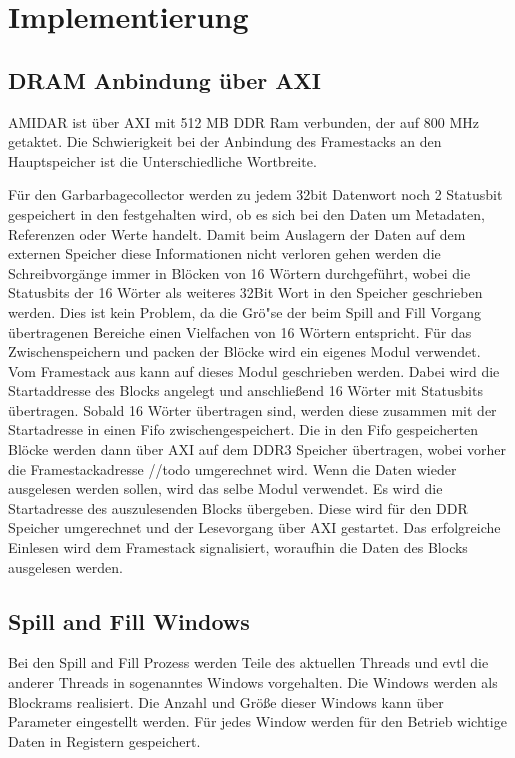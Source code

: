 \chapter{Implementierung}
\label{cha:Implementierung}
\section{DRAM Anbindung \"uber AXI}
AMIDAR ist \"uber AXI mit 512 MB DDR Ram verbunden, der auf 800 MHz getaktet.
Die Schwierigkeit bei der Anbindung des Framestacks an den Hauptspeicher ist die Unterschiedliche Wortbreite. 

F\"ur den Garbarbagecollector werden zu jedem 32bit Datenwort noch 2 Statusbit gespeichert in den festgehalten wird, ob es sich bei den Daten um Metadaten, Referenzen oder Werte handelt. Damit beim Auslagern der Daten auf dem externen Speicher diese Informationen nicht verloren gehen werden die Schreibvorg\"ange immer in Bl\"ocken von 16 W\"ortern durchgef\"uhrt, wobei die Statusbits der 16 W\"orter als weiteres 32Bit Wort in den Speicher geschrieben werden. Dies ist kein Problem, da die Gr\"o"se der beim Spill and Fill Vorgang \"ubertragenen Bereiche einen Vielfachen von 16 W\"ortern entspricht. 
F\"ur das Zwischenspeichern und packen der Bl\"ocke wird ein eigenes Modul verwendet.
Vom Framestack aus kann auf dieses Modul geschrieben werden. Dabei wird die Startaddresse des Blocks angelegt und anschließend 16 W\"orter mit Statusbits \"ubertragen. Sobald 16 W\"orter \"ubertragen sind, werden diese zusammen mit der Startadresse in einen Fifo zwischengespeichert. Die in den Fifo gespeicherten Bl\"ocke werden dann \"uber AXI auf dem DDR3 Speicher \"ubertragen, wobei vorher die Framestackadresse //todo umgerechnet wird. 
Wenn die Daten wieder ausgelesen werden sollen, wird das selbe Modul verwendet. Es wird die Startadresse des auszulesenden Blocks \"ubergeben. Diese wird f\"ur den DDR Speicher umgerechnet und der Lesevorgang \"uber AXI gestartet. Das erfolgreiche Einlesen wird dem Framestack signalisiert, woraufhin die Daten des Blocks ausgelesen werden. 

\section{Spill and Fill Windows}

Bei den Spill and Fill Prozess werden Teile des aktuellen Threads  und evtl die anderer Threads in sogenanntes Windows vorgehalten. Die Windows werden als Blockrams realisiert. 
Die Anzahl und Größe dieser Windows kann über Parameter eingestellt werden. Für jedes Window werden für den Betrieb wichtige Daten in Registern gespeichert. 


